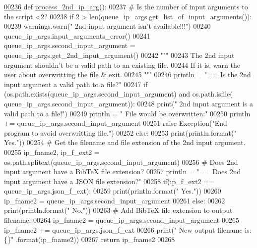 \begin{DoxyCode}
\hypertarget{classutilities_1_1queue__ip__arguments_1_1queue__ip__args_l00236}{}\hyperlink{classutilities_1_1queue__ip__arguments_1_1queue__ip__args_a82d245379c48196f61d4268882dd5c6d}{00236}     \textcolor{keyword}{def }\hyperlink{classutilities_1_1queue__ip__arguments_1_1queue__ip__args_a82d245379c48196f61d4268882dd5c6d}{process\_2nd\_ip\_arg}():
00237         \textcolor{comment}{#   Is the number of input arguments to the script <2?}
00238         \textcolor{keywordflow}{if} 2 > len(queue\_ip\_args.get\_list\_of\_input\_arguments()):
00239             warnings.warn(\textcolor{stringliteral}{" 2nd input argument isn't available!!!"})
00240             queue\_ip\_args.input\_arguments\_error()
00241         queue\_ip\_args.second\_input\_argument = queue\_ip\_args.get\_2nd\_input\_argument()
00242         \textcolor{stringliteral}{"""}
00243 \textcolor{stringliteral}{        The 2nd input argument shouldn't be a valid path to an existing file.}
00244 \textcolor{stringliteral}{        If it is, warn the user about overwritting the file & exit.}
00245 \textcolor{stringliteral}{        """}
00246         println = \textcolor{stringliteral}{"==   Is the 2nd input argument a valid path to a file?"}
00247         \textcolor{keywordflow}{if} (os.path.exists(queue\_ip\_args.second\_input\_argument) \textcolor{keywordflow}{and} os.path.isfile(
      queue\_ip\_args.second\_input\_argument)):
00248             print(\textcolor{stringliteral}{" 2nd input argument is a valid path to a file!"})
00249             println = \textcolor{stringliteral}{" File would be overwritten:"}
00250             println += queue\_ip\_args.second\_input\_argument
00251             \textcolor{keywordflow}{raise} Exception(\textcolor{stringliteral}{"End program to avoid overwritting file."})
00252         \textcolor{keywordflow}{else}:
00253             print(println.format(\textcolor{stringliteral}{"  Yes."}))
00254         \textcolor{comment}{#   Get the filename and file extension of the 2nd input argument.}
00255         ip\_fname2, ip\_f\_ext2 = os.path.splitext(queue\_ip\_args.second\_input\_argument)
00256         \textcolor{comment}{#   Does 2nd input argument have a BibTeX file extension?}
00257         println = \textcolor{stringliteral}{"==   Does 2nd input argument have a JSON file extension?"}
00258         if(ip\_f\_ext2 == queue\_ip\_args.json\_f\_ext):
00259             print(println.format(\textcolor{stringliteral}{"  Yes."}))
00260             ip\_fname2 = queue\_ip\_args.second\_input\_argument
00261         \textcolor{keywordflow}{else}:
00262             print(println.format(\textcolor{stringliteral}{"  No."}))
00263             \textcolor{comment}{#   Add BibTeX file extension to output filename.}
00264             ip\_fname2 = queue\_ip\_args.second\_input\_argument
00265             ip\_fname2 += queue\_ip\_args.json\_f\_ext
00266             print(\textcolor{stringliteral}{" New output filename is: \{\}"} .format(ip\_fname2))
00267         \textcolor{keywordflow}{return} ip\_fname2
00268 \end{DoxyCode}
